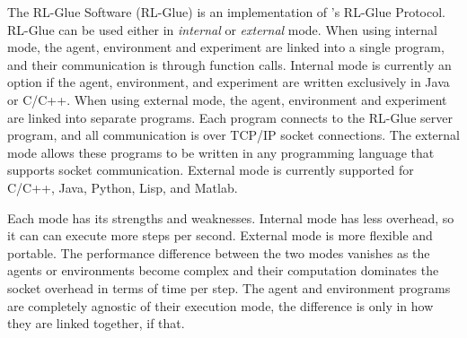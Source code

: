 \documentclass[twoside,11pt]{article}
\begin{document}
The RL-Glue Software (RL-Glue) is an implementation of \citeauthor{whitesutton}'s RL-Glue Protocol.  RL-Glue can be used either in {\it internal} or {\it external} mode.  When using internal mode, the agent, environment and experiment are linked into a single program, and their communication is through function calls.  Internal mode is currently an option if the agent, environment, and experiment are written exclusively in Java or C/C++.  When using  external mode, the agent, environment and experiment are linked into separate programs.  Each program connects to the RL-Glue server program, and all communication is over TCP/IP socket connections. The external mode allows these programs to be written in any programming language that supports socket communication.  External mode is currently supported for C/C++, Java, Python, Lisp, and Matlab.

Each mode has its strengths and weaknesses. Internal mode has less overhead, so it can can execute more steps per second. External mode is more flexible and portable.  The performance difference between the two modes vanishes as the agents or environments become complex and their computation dominates the socket overhead in terms of time per step.  The agent and environment programs are completely agnostic of their execution mode, the difference is only in how they are linked together, if that.



\end{document}
